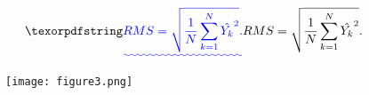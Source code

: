 \begin{equation}
	\DIFadd{RMS = \sqrt{\frac{1}{N}\sum_{k=1}^{N}\hat{Y_k}^2}.	
	\label{RMS}
}\end{equation}
\begin{figure}[!h]
	\centering
	\texttt{[image: figure3.png]}
	\caption{}
	\label{fig:Diagram_exp_predictions}
\end{figure}
\newpage \DIFaddend